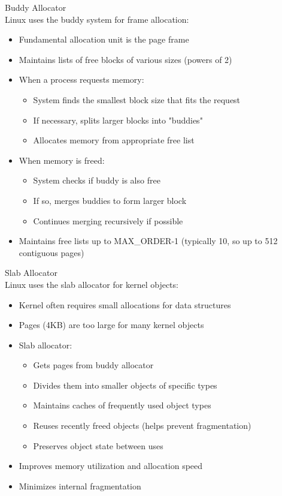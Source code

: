 \begin{definition}{Buddy Allocator}\\
    Linux uses the buddy system for frame allocation:
    \begin{itemize}
        \item Fundamental allocation unit is the page frame
        \item Maintains lists of free blocks of various sizes (powers of 2)
        \item When a process requests memory:
            \begin{itemize}
                \item System finds the smallest block size that fits the request
                \item If necessary, splits larger blocks into "buddies"
                \item Allocates memory from appropriate free list
            \end{itemize}
        \item When memory is freed:
            \begin{itemize}
                \item System checks if buddy is also free
                \item If so, merges buddies to form larger block
                \item Continues merging recursively if possible
            \end{itemize}
        \item Maintains free lists up to MAX\_ORDER-1 (typically 10, so up to 512 contiguous pages)
    \end{itemize}
\end{definition}

\begin{definition}{Slab Allocator}\\
    Linux uses the slab allocator for kernel objects:
    \begin{itemize}
        \item Kernel often requires small allocations for data structures
        \item Pages (4KB) are too large for many kernel objects
        \item Slab allocator:
            \begin{itemize}
                \item Gets pages from buddy allocator
                \item Divides them into smaller objects of specific types
                \item Maintains caches of frequently used object types
                \item Reuses recently freed objects (helps prevent fragmentation)
                \item Preserves object state between uses
            \end{itemize}
        \item Improves memory utilization and allocation speed
        \item Minimizes internal fragmentation
    \end{itemize}
\end{definition}

